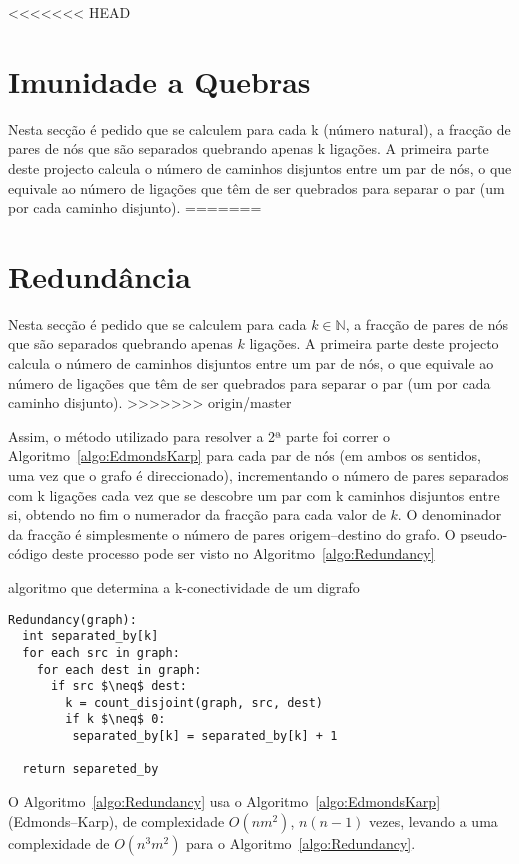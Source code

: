 \documentclass[10pt,a4paper]{article}
\begin{document}
<<<<<<< HEAD
\section{Imunidade a Quebras}
Nesta secção é pedido que se calculem para cada k (número natural), a fracção de pares de nós que são separados quebrando apenas k ligações. A primeira parte deste projecto calcula o número de caminhos disjuntos entre um par de nós, o que equivale ao número de ligações que têm de ser quebrados para separar o par (um por cada caminho disjunto). 
=======
\section{Redundância}
Nesta secção é pedido que se calculem para cada $k \in \mathbb{N} $, a fracção de pares de nós que são separados quebrando apenas $k$ ligações. A primeira parte deste projecto calcula o número de caminhos disjuntos entre um par de nós, o que equivale ao número de ligações que têm de ser quebrados para separar o par (um por cada caminho disjunto). 
>>>>>>> origin/master

Assim, o método utilizado para resolver a 2ª parte foi correr o Algoritmo~\ref{algo:EdmondsKarp} para cada par de nós (em ambos os sentidos, uma vez que o grafo é direccionado), incrementando o número de pares separados com k ligações cada vez que se descobre um par com k caminhos disjuntos entre si, obtendo no fim o numerador da fracção para cada valor de $k$. O denominador da fracção é simplesmente o número de pares origem--destino do grafo. O pseudo-código deste processo pode ser visto no Algoritmo~\ref{algo:Redundancy} 

\begin{algorithm}[h]
\caption{algoritmo que determina a k-conectividade de um digrafo}
\label{algo:Redundancy}
\begin{lstlisting}[linewidth=0.95\linewidth, mathescape]
Redundancy(graph):
  int separated_by[k]
  for each src in graph:
    for each dest in graph:
      if src $\neq$ dest:
        k = count_disjoint(graph, src, dest)
        if k $\neq$ 0:
         separated_by[k] = separated_by[k] + 1 

  return separeted_by
\end{lstlisting}
\end{algorithm}

O Algoritmo~\ref{algo:Redundancy} usa o Algoritmo~\ref{algo:EdmondsKarp} (Edmonds--Karp), de complexidade $O(n m^2)$, $n(n-1)$ vezes, levando a uma complexidade de $O(n^3 m^2)$ para o Algoritmo~\ref{algo:Redundancy}.
\end{document}
